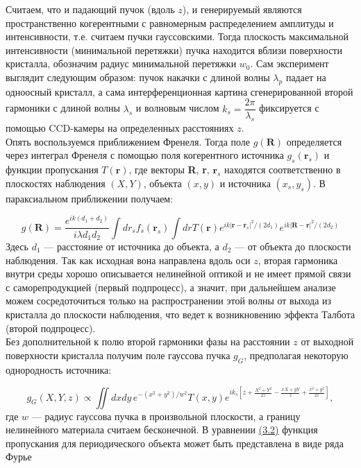 Считаем, что и падающий пучок (вдоль $z$), и генерируемый являются пространственно когерентными с равномерным распределением амплитуды и интенсивности, т.е. считаем пучки гауссовскими. Тогда плоскость максимальной интенсивности (минимальной перетяжки) пучка  находится вблизи поверхности кристалла, обозначим радиус минимальной перетяжки $w_0$. Сам эксперимент\cite{wen2011} выглядит следующим образом: пучок накачки с длиной волны $\lambda_p$ падает на одноосный кристалл, а сама интерференционная картина сгенерированной второй гармоники с длиной волны $\lambda_s$ и волновым числом $k_s = \dfrac{2\pi}{\lambda_s}$ фиксируется с помощью  CCD-камеры на определенных расстояниях $z$.\\

Опять воспользуемся приближением Френеля. Тогда поле $g(\textbf{R})$ определяется через интеграл Френеля с помощью поля когерентного источника $g_s(\textbf{r}_s)$ и функции пропускания $T(\textbf{r})$, где векторы \textbf{R}, \textbf{r}, $\textbf{r}_s$
 находятся соответственно в плоскостях наблюдения $(X, Y)$, объекта $(x, y)$ и источника $(x_s, y_s)$. В параксиальном приближении получаем:

\begin{equation}
g(\textbf{R}) = \frac{e^{ik(d_1+d_2)}}{i\lambda d_1 d_2} \int dr_s f_s(\textbf{r}_s) \int dr T(\textbf{r}) e^{ik|\textbf{r}-\textbf{r}_s|^2/(2d_1)} e^{ik|\textbf{R}-\textbf{r}|^2/(2d_2)}
\end{equation}
Здесь $d_1$ --- расстояние от источника до объекта, а $d_2$ --- от объекта до плоскости наблюдения. Так как исходная вона направлена вдоль оси $z$, вторая гармоника внутри среды хорошо описывается нелинейной оптикой и не имеет прямой связи с саморепродукцией (первый подпроцесс), а значит, при дальнейшем анализе можем сосредоточиться только на распространении этой волны от выхода из кристалла до плоскости наблюдения, что ведет к возникновению эффекта Талбота (второй подпроцесс).\\

Без дополнительной к полю второй гармоники фазы на расстоянии $z$ от выходной поверхности кристалла получим поле гауссова пучка $g_G$, предполагая некоторую однородность источника:

\begin{equation}
\label{3_2}
g_G(X,Y,z) \propto \iint dxdy\, e^{-(x^2+y^2)/w^2} T(x,y) e^{ik_s\left[z + \frac{X^2+Y^2}{2z} - \frac{xX+yY}{z} + \frac{x^2+y^2}{2z}\right]},
\end{equation}
где $w$ --- радиус гауссова пучка в произвольной плоскости, а границу нелинейного материала считаем бесконечной. В уравнении \hyperref[3_2]{(3.2)} функция пропускания для периодического объекта может быть представлена в виде ряда Фурье

